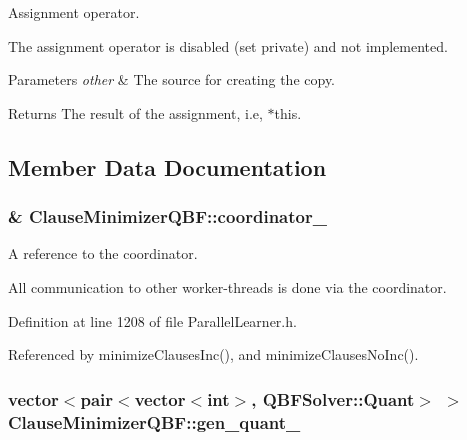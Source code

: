 Assignment operator. 

The assignment operator is disabled (set private) and not implemented.


\begin{DoxyParams}{Parameters}
{\em other} & The source for creating the copy. \\
\hline
\end{DoxyParams}
\begin{DoxyReturn}{Returns}
The result of the assignment, i.\-e, $\ast$this. 
\end{DoxyReturn}


\subsection{Member Data Documentation}
\hypertarget{classClauseMinimizerQBF_afff0ec1ad36fe55af388320c9b55f162}{
\subsubsection[{coordinator\-\_\-}]{\& Clause\-Minimizer\-Q\-B\-F\-::coordinator\-\_\-\hspace{0.3cm}{\ttfamily [protected]}}}\label{classClauseMinimizerQBF_afff0ec1ad36fe55af388320c9b55f162}


A reference to the coordinator. 

All communication to other worker-\/threads is done via the coordinator. 

Definition at line 1208 of file Parallel\-Learner.\-h.



Referenced by minimize\-Clauses\-Inc(), and minimize\-Clauses\-No\-Inc().

\hypertarget{classClauseMinimizerQBF_a4bd08f4de32c9a738e48cae22b93fa22}{
\subsubsection[{gen\-\_\-quant\-\_\-}]{\setlength{\rightskip}{0pt plus 5cm}vector$<$pair$<$vector$<$int$>$, {\bf Q\-B\-F\-Solver\-::\-Quant}$>$ $>$ Clause\-Minimizer\-Q\-B\-F\-::gen\-\_\-quant\-\_\-\hspace{0.3cm}{\ttfamily [protected]}}}\label{classClauseMinimizerQBF_a4bd08f4de32c9a738e48cae22b93fa22}


